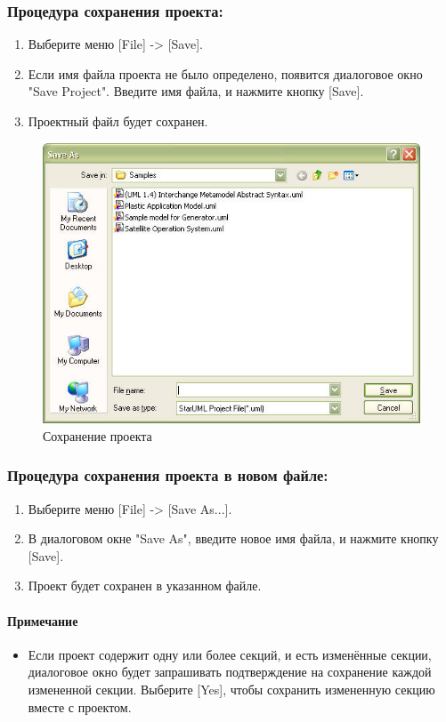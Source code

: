 \documentclass[a4paper,12pt]{report}
\begin{document}
\subsubsection*{Процедура сохранения проекта:}
\begin{enumerate}
	\item Выберите меню [File] -> [Save].
	\item Если имя файла проекта не было определено, появится диалоговое окно "Save Project".
	Введите имя файла, и нажмите кнопку [Save].
	\item Проектный файл будет сохранен.
\end{enumerate}
\begin{figure}[h!]
	\centering
	\includegraphics[width=0.7\linewidth]{images/saveproject}
	\caption{Сохранение проекта}
	\label{fig:saveproject}
\end{figure}


\subsubsection*{Процедура сохранения проекта в новом файле:}
\begin{enumerate}
	\item Выберите меню [File] -> [Save As...].
	\item В диалоговом окне "Save As", введите новое имя файла, и нажмите кнопку [Save].
	\item Проект будет сохранен в указанном файле.
\end{enumerate}

\paragraph{Примечание}
\begin{itemize}
	\item Если проект содержит одну или более секций, и есть изменённые секции, диалоговое окно
	будет запрашивать подтверждение на сохранение каждой измененной секции. Выберите
	[Yes], чтобы сохранить измененную секцию вместе с проектом.
\end{itemize}
\end{document}
